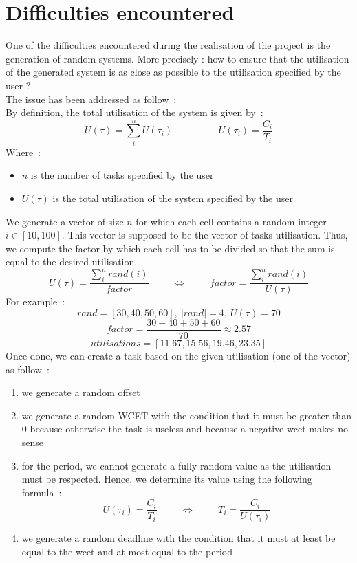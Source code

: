 \documentclass[a4paper,11pt]{article}
\begin{document}
\section{Difficulties encountered}
  One of the difficulties encountered during the realisation of the project is the generation of random systems. More precisely : how to ensure that the utilisation of the generated system is as close as possible to the utilisation specified by the user ?\\
  The issue has been addressed as follow~:\\
  By definition, the total utilisation of the system is given by~:
  \[U(\tau)=\sum\limits_{i}^{n}U(\tau_{i}) \hspace{2cm} U(\tau_{i})=\frac{C_{i}}{T_{i}}\]
  Where~:
  \begin{itemize}
    \item $n$ is the number of tasks specified by the user
    \item $U(\tau)$ is the total utilisation of the system specified by the user
  \end{itemize}
  We generate a vector of size $n$ for which each cell contains a random integer $i \in [10, 100]$. This vector is supposed to be the vector of tasks utilisation. Thus, we compute the factor by which each cell has to be divided so that the sum is equal to the desired utilisation.
  \[U(\tau)=\frac{\sum_{i}^{n}rand(i)}{factor} \hspace{1cm} \Leftrightarrow \hspace{1cm} factor=\frac{\sum_{i}^{n}rand(i)}{U(\tau)}\]
  For example~:
  \[rand = [30, 40, 50, 60],~|rand| = 4,~U(\tau)=70\]
  \[factor = \frac{30+40+50+60}{70} \approx 2.57\]
  \[utilisations = [11.67, 15.56, 19.46, 23.35]\]
  Once done, we can create a task based on the given utilisation (one of the vector) as follow~:
  \begin{enumerate}
    \item we generate a random offset
    \item we generate a random WCET with the condition that it must be greater than 0 because otherwise the task is useless and because a negative wcet makes no sense
    \item for the period, we cannot generate a fully random value as the utilisation must be respected. Hence, we determine its value using the following formula~:
      \[U(\tau_{i}) = \frac{C_{i}}{T_{i}} \hspace{1cm} \Leftrightarrow \hspace{1cm} T_{i} = \frac{C_{i}}{U(\tau_{i})}\]
    \item we generate a random deadline with the condition that it must at least be equal to the wcet and at most equal to the period
  \end{enumerate}
\end{document}
